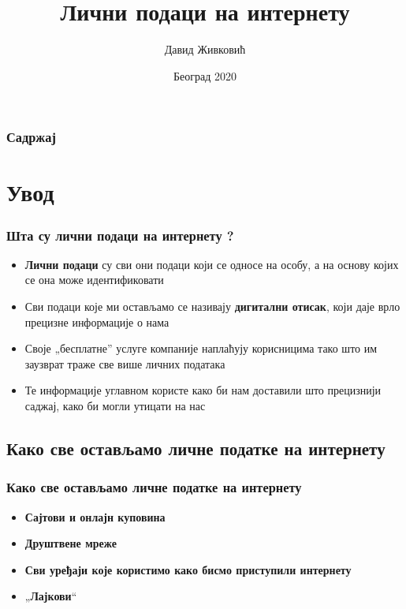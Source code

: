 \documentclass{beamer}
\title{Лични подаци на интернету}
\author{Давид Живковић}
\institute{Математички факултет\\Универзитет у Београду}
\date{
	\footnotesize{Београд 2020}
}
\begin{document}
\begin{frame}
	\thispagestyle{empty}
	\titlepage
\end{frame}

\addtocounter{framenumber}{-1}


\begin{frame}
	\frametitle{Садржај} 
	\tableofcontents[hidesubsections] 
\end{frame}


\section{Увод}

\begin{frame}[fragile]\frametitle{Шта су лични подаци на интернету ?}
	\begin{itemize}	
		\item \textbf{Лични подаци} су сви они подаци који се односе на особу, а на основу којих се она може идентификовати
		\item Сви подаци које ми остављамо се називају \textbf{дигитални отисак}, који даје врло прецизне информације о нама
		\item Своје „бесплатне” услуге компаније наплаћују корисницима тако што им заузврат траже све више личних података
		\item Те информације углавном користе како би нам доставили што прецизнији саджај, како би могли утицати на нас 
		
		
	\end{itemize}
\end{frame}


\subsection{Како све остављамо личне податке на интернету}

\begin{frame}[fragile]\frametitle{Како све остављамо личне податке на интернету}
	\begin{itemize}	
		\item \textbf{Сајтови и онлајн куповина}
		\item \textbf{Друштвене мреже}
		\item \textbf{Сви уређаји које користимо како бисмо приступили интернету}
		\item „\textbf{Лајкови}“
		
	\end{itemize}
\end{frame}
\end{document}
